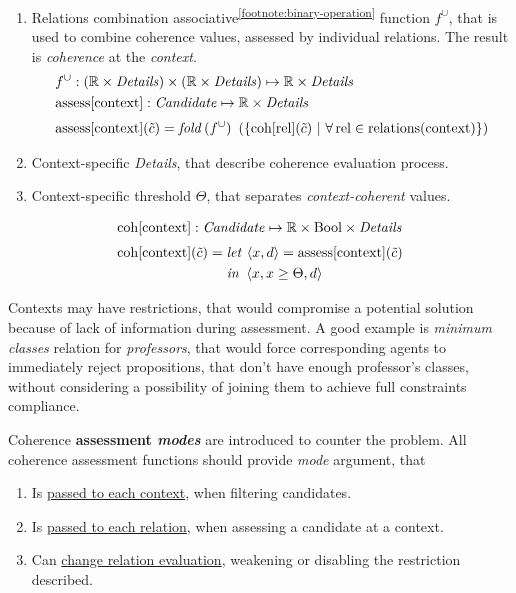 \documentclass[../ThesisDoc]{subfiles}
\begin{document}
\begin{enumerate}
\begin{itemize}
        \end{itemize}
  \item Relations combination associative\textsuperscript{\ref{footnote:binary-operation}}
        function $f^\cup$, that is used to combine coherence values, assessed by
        individual relations. The result is \emph{coherence} at the \emph{context}.
        \begin{align*}
          & f^\cup: (\mathbb{R} \times \mathit{Details}) \times
                    (\mathbb{R} \times \mathit{Details})
             \mapsto \mathbb{R} \times \mathit{Details} \\
          & \mathrm{assess}[\mathrm{context}]: \mathit{Candidate} \mapsto
                                               \mathbb{R} \times \mathit{Details}
          \\[0.3em]
          & \mathrm{assess}[\mathrm{context}](\tilde{c}) =
            \mathit{fold}\, (f^\cup) ~ \left(
            \lbrace \mathrm{coh}[\mathrm{rel}](\tilde{c}) ~|~
                    \forall\, \mathrm{rel} \in \mathrm{relations}(\mathrm{context})
            \rbrace\right)
        \end{align*}

  \item Context-specific \emph{Details}, that describe coherence evaluation process.
  \item Context-specific threshold $\Theta$, that separates \emph{context-coherent} values.
\end{enumerate}

\begin{align*}
  & \mathrm{coh}[\mathrm{context}]: \mathit{Candidate} \mapsto \mathbb{R} \times
                            \mathrm{Bool} \times \mathit{Details}
  \\[0.3em]
  & \mathrm{coh}[\mathrm{context}](\tilde{c}) =
      \begin{aligned}[t] & \mathit{let}\,  \left<x,d\right> = \mathrm{assess}[\mathrm{context}](\tilde{c})  \\& \mathit{in}~ \left<x, x \geq \Theta, d\right> \end{aligned}
\end{align*}


\medskip
\noindent
Contexts may have restrictions, that would compromise a potential solution
because of lack of information during assessment. A good example is
\emph{minimum classes} relation for \emph{professors}, that would force
corresponding agents to immediately reject propositions, that don't have enough
professor's classes, without considering a possibility of joining them to achieve
full constraints compliance.

Coherence \textbf{assessment \emph{modes}} are introduced to counter the problem.
All coherence assessment functions should provide \emph{mode} argument, that
\begin{enumerate}
  \item Is \underline{passed to each context}, when filtering candidates.
  \item Is \underline{passed to each relation}, when assessing a candidate at a context.
  \item Can \underline{change relation evaluation}, weakening or disabling the
        restriction described.
\end{enumerate}
\end{document}
